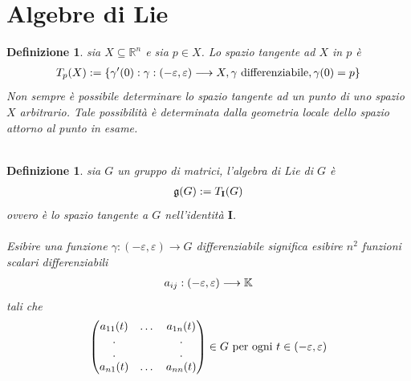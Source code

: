 \documentclass[oneside, 11pt]{amsbook}
\newcommand{\0}{{(0)}}
\newcommand{\3}{{(3)}}
\theoremstyle{colonplain}
\theoremstyle{colondefinition}
\newtheorem{defn}[thm]{Definizione}
\theoremstyle{colonremark}
\numberwithin{equation}{chapter}
\begin{document}
\section{Algebre di Lie}
\begin{defn} sia $X \subseteq \mathbb{R}^n$ e sia $p \in X$. Lo \textit{spazio tangente} ad $X$ in $p$ è
\begin{align}
    T_p(X) := \{ \gamma'(0) : \gamma : (-\varepsilon, \varepsilon) \longrightarrow X, \gamma \text{ differenziabile}, \gamma(0) = p \} \notag
\end{align}
Non sempre è possibile determinare lo spazio tangente ad un punto di uno spazio $X$ arbitrario. Tale possibilità è determinata dalla geometria locale dello spazio attorno al punto in esame. \\ \\
\end{defn}
\begin{defn} sia $G$ un gruppo di matrici, l'\textit{algebra di Lie} di $G$ è
\begin{align}
    \mathfrak{g}(G) := T_{\mathbf{I}}(G) \notag
\end{align}
ovvero è lo spazio tangente a $G$ nell'identità $\mathbf{I}$. \\ \\
Esibire una funzione $\gamma : (-\varepsilon, \varepsilon) \longrightarrow G$ differenziabile significa esibire $n^2$ funzioni scalari differenziabili
\begin{align}
    a_{ij} : (-\varepsilon, \varepsilon) \longrightarrow \mathbb{K} \notag
\end{align}
tali che
\begin{align}
    \begin{pmatrix}
        a_{11}(t) & \dots & a_{1n}(t) \\
        . & & . \\
        . & & . \\
        a_{n1}(t) & \dots & a_{nn}(t) 
    \end{pmatrix} \in G \text{ per ogni } t \in (-\varepsilon, \varepsilon) \notag
\end{align} \\ \\
\end{defn}
\end{document}
